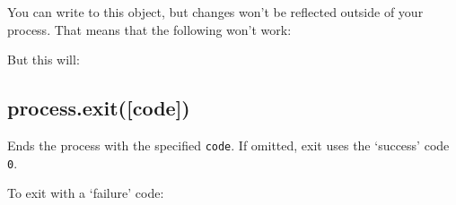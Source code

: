 \begin{Shaded}
\begin{Highlighting}[]
\NormalTok{\{ }\NormalTok{: }\NormalTok{,}
  \NormalTok{: }\NormalTok{,}
  \NormalTok{: }\NormalTok{,}
  \NormalTok{: }\NormalTok{,}
  \NormalTok{: }\NormalTok{,}
  \NormalTok{: }\NormalTok{,}
  \NormalTok{: }\NormalTok{,}
  \NormalTok{: }\NormalTok{,}
  \NormalTok{: }\NormalTok{,}
  \DataTypeTok{_}\NormalTok{: } \NormalTok{\}}
\end{Highlighting}
\end{Shaded}

You can write to this object, but changes won't be reflected outside of
your process. That means that the following won't work:

\begin{Shaded}
\begin{Highlighting}[]
 
\end{Highlighting}
\end{Shaded}

But this will:

\begin{Shaded}
\begin{Highlighting}[]
 \NormalTok{= }\NormalTok{;}
\NormalTok{(}\NormalTok{);}
\end{Highlighting}
\end{Shaded}

\subsection{process.exit({[}code{]})}\label{process.exitcode}

Ends the process with the specified \texttt{code}. If omitted, exit uses
the `success' code \texttt{0}.

To exit with a `failure' code:

